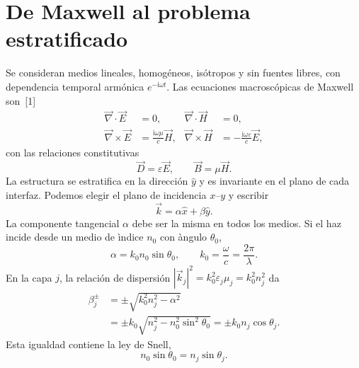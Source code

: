 \documentclass[10pt,a4paper]{article}
\newcommand{\ii}{\mathrm{i}}
\newcommand{\vE}{\vec{E}}
\newcommand{\vH}{\vec{H}}
\newcommand{\vk}{\vec{k}}
\begin{document}
\section{De Maxwell al problema estratificado}

Se consideran medios lineales, homog\'eneos, is\'otropos y sin fuentes libres, con dependencia temporal arm\'onica $e^{-\ii\omega t}$. Las ecuaciones macrosc\'opicas de Maxwell son~[1]
\begin{align}
\vec{\nabla}\cdot\vE&=0,
&\vec{\nabla}\cdot\vH&=0,\\
\vec{\nabla}\times\vE&=\frac{\ii\omega\mu}{c}\vH,
&\vec{\nabla}\times\vH&=-\frac{\ii\omega\varepsilon}{c}\vE,
\label{eq:maxwell}
\end{align}
con las relaciones constitutivas
\begin{equation}
\vec D=\varepsilon\vE,
\qquad
\vec B=\mu\vH.
\label{eq:constitutivas}
\end{equation}
La estructura se estratifica en la direcci\'on $\hat y$ y es invariante en el plano de cada interfaz. Podemos elegir el plano de incidencia $x$--$y$ y escribir
\begin{equation}
\vk=\alpha\hat x+\beta\hat y.
\label{eq:k-vector}
\end{equation}
La componente tangencial $\alpha$ debe ser la misma en todos los medios. Si el haz incide desde un medio de \`indice $n_0$ con \`angulo $\theta_0$,
\begin{equation}
\alpha=k_0n_0\sin\theta_0,
\qquad
k_0=\frac{\omega}{c}=\frac{2\pi}{\lambda}.
\label{eq:alpha}
\end{equation}
En la capa $j$, la relaci\'on de dispersi\'on $|\vk_j|^2=k_0^2\varepsilon_j\mu_j=k_0^2n_j^2$ da
\begin{align}
\beta_j^{\pm}
&=\pm\sqrt{k_0^2n_j^2-\alpha^2}\\
&=\pm k_0\sqrt{n_j^2-n_0^2\sin^2\theta_0}
=\pm k_0n_j\cos\theta_j.
\label{eq:beta}
\end{align}
Esta igualdad contiene la ley de Snell,
\begin{equation}
n_0\sin\theta_0=n_j\sin\theta_j.
\label{eq:snell}
\end{equation}
\end{document}
